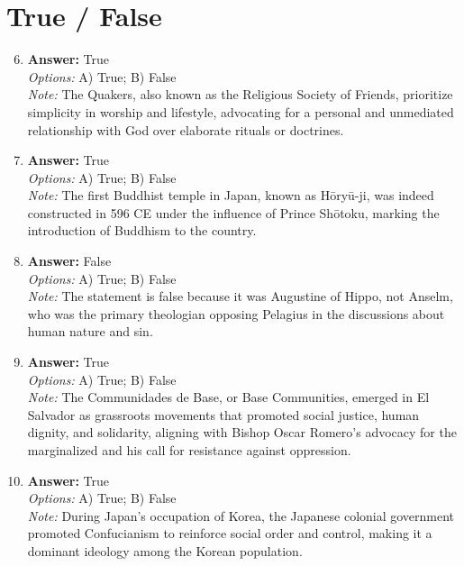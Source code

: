 \documentclass[12pt]{article}
\begin{document}
\section*{True / False}
\begin{enumerate}[label=\arabic*.]
\setcounter{enumi}{5}
\item \textbf{Answer:} True
\\ \textit{Options:} A) True; B) False
\\ \textit{Note:} The Quakers, also known as the Religious Society of Friends, prioritize simplicity in worship and lifestyle, advocating for a personal and unmediated relationship with God over elaborate rituals or doctrines.
\item \textbf{Answer:} True
\\ \textit{Options:} A) True; B) False
\\ \textit{Note:} The first Buddhist temple in Japan, known as Hōryū-ji, was indeed constructed in 596 CE under the influence of Prince Shōtoku, marking the introduction of Buddhism to the country.
\item \textbf{Answer:} False
\\ \textit{Options:} A) True; B) False
\\ \textit{Note:} The statement is false because it was Augustine of Hippo, not Anselm, who was the primary theologian opposing Pelagius in the discussions about human nature and sin.
\item \textbf{Answer:} True
\\ \textit{Options:} A) True; B) False
\\ \textit{Note:} The Communidades de Base, or Base Communities, emerged in El Salvador as grassroots movements that promoted social justice, human dignity, and solidarity, aligning with Bishop Oscar Romero's advocacy for the marginalized and his call for resistance against oppression.
\item \textbf{Answer:} True
\\ \textit{Options:} A) True; B) False
\\ \textit{Note:} During Japan's occupation of Korea, the Japanese colonial government promoted Confucianism to reinforce social order and control, making it a dominant ideology among the Korean population.
\end{enumerate}
\end{document}
